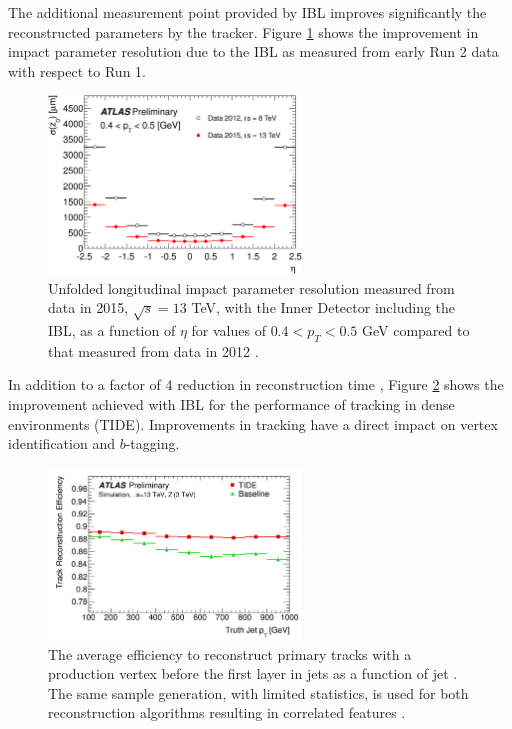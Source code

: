 The additional measurement point provided by IBL improves significantly the reconstructed parameters by the tracker. Figure \ref{fig:chap2:ATLAS:ITK:IBL:Imp} shows the improvement in impact parameter resolution due to the IBL as measured from early Run 2 data with respect to Run 1. 
\begin{figure}[htbp]
    \centering
    \includegraphics[width=0.6\textwidth]{Ch2/Img/IBL_impact.png}
    \caption{Unfolded longitudinal impact parameter resolution measured from data in 2015, $\sqrt{s}= 13$ TeV, with the Inner Detector including the IBL, as a function of $\eta$  for values of $0.4 < p_{T} < 0.5$ GeV compared to that measured from data in 2012 \cite{IBL_IP}.}
    \label{fig:chap2:ATLAS:ITK:IBL:Imp}
\end{figure}
In addition to a factor of 4 reduction in reconstruction time \cite{IBL_Time}, Figure \ref{fig:chap2:ATLAS:ITK:IBL:Trk} shows the improvement achieved with IBL for the performance of tracking in dense environments (TIDE). Improvements in tracking have a direct impact on vertex identification and $b$-tagging. 
\begin{figure}[htbp]
    \centering
    \includegraphics[width=0.6\textwidth]{Ch2/Img/IBL_track.png}
    \caption{The average efficiency to reconstruct primary tracks with a production vertex before the first layer in jets as a function of jet \pT. The same sample generation, with limited statistics, is used for both reconstruction algorithms resulting in correlated features \cite{IBL_Trk}.}
    \label{fig:chap2:ATLAS:ITK:IBL:Trk}
\end{figure}
